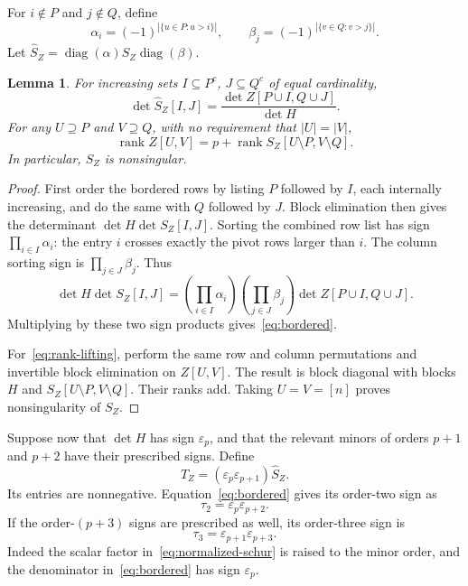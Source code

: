 \documentclass[10pt,a4paper]{article}
\newtheorem{lemma}[theorem]{Lemma}
\theoremstyle{definition}
\theoremstyle{remark}
\numberwithin{equation}{section}
\newcommand{\eps}{\varepsilon}
\DeclareMathOperator{\rank}{rank}
\DeclareMathOperator{\diag}{diag}
\begin{document}
For $i\notin P$ and $j\notin Q$, define
\begin{equation}\label{eq:ordering-signs}
 \alpha_i=(-1)^{|\{u\in P:u>i\}|},\qquad
 \beta_j=(-1)^{|\{v\in Q:v>j\}|}.
\end{equation}
Let $\widehat S_Z=\diag(\alpha)S_Z\diag(\beta)$.

\begin{lemma}\label{lem:schur}
For increasing sets $I\subseteq P^c$, $J\subseteq Q^c$ of equal
cardinality,
\begin{equation}\label{eq:bordered}
 \det\widehat S_Z[I,J]
   =\frac{\det Z[P\cup I,Q\cup J]}{\det H}.
\end{equation}
For any $U\supseteq P$ and $V\supseteq Q$, with no requirement
that $|U|=|V|$,
\begin{equation}\label{eq:rank-lifting}
 \rank Z[U,V]
   =p+\rank S_Z[U\setminus P,V\setminus Q].
\end{equation}
In particular, $S_Z$ is nonsingular.
\end{lemma}

\begin{proof}
First order the bordered rows by listing $P$ followed by $I$, each
internally increasing, and do the same with $Q$ followed by $J$.
Block elimination then gives the determinant
$\det H\det S_Z[I,J]$. Sorting the combined row list has sign
$\prod_{i\in I}\alpha_i$: the entry $i$ crosses exactly the pivot
rows larger than $i$. The column sorting sign is
$\prod_{j\in J}\beta_j$. Thus
\[
 \det H\det S_Z[I,J]
 =\left(\prod_{i\in I}\alpha_i\right)
  \left(\prod_{j\in J}\beta_j\right)
  \det Z[P\cup I,Q\cup J].
\]
Multiplying by these two sign products gives~\eqref{eq:bordered}.

For~\eqref{eq:rank-lifting}, perform the same row and column
permutations and invertible block elimination on $Z[U,V]$.
The result is block diagonal with blocks $H$ and
$S_Z[U\setminus P,V\setminus Q]$. Their ranks add. Taking $U=V=[n]$
proves nonsingularity of $S_Z$.
\end{proof}

Suppose now that $\det H$ has sign $\eps_p$, and that the relevant
minors of orders $p+1$ and $p+2$ have their prescribed signs.
Define
\begin{equation}\label{eq:normalized-schur}
 T_Z=(\eps_p\eps_{p+1})\widehat S_Z.
\end{equation}
Its entries are nonnegative. Equation~\eqref{eq:bordered} gives its
order-two sign as
\[
 \tau_2=\eps_p\eps_{p+2}.
\]
If the order-$(p+3)$ signs are prescribed as well, its order-three
sign is
\[
 \tau_3=\eps_{p+1}\eps_{p+3}.
\]
Indeed the scalar factor in~\eqref{eq:normalized-schur} is raised
to the minor order, and the denominator in~\eqref{eq:bordered}
has sign $\eps_p$.
\end{document}
